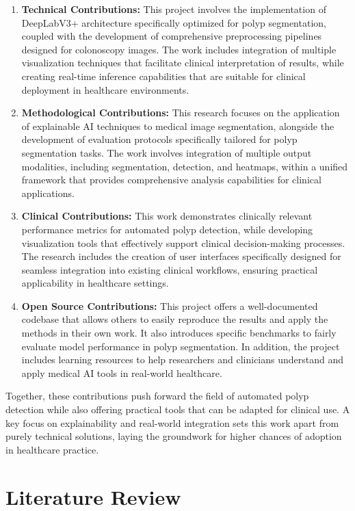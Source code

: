 \documentclass[a4paper,12pt]{report}
\begin{document}
\begin{enumerate}
    \item \textbf{Technical Contributions:} This project involves the implementation of DeepLabV3+ architecture specifically optimized for polyp segmentation, coupled with the development of comprehensive preprocessing pipelines designed for colonoscopy images. The work includes integration of multiple visualization techniques that facilitate clinical interpretation of results, while creating real-time inference capabilities that are suitable for clinical deployment in healthcare environments.

    \item \textbf{Methodological Contributions:} This research focuses on the application of explainable AI techniques to medical image segmentation, alongside the development of evaluation protocols specifically tailored for polyp segmentation tasks. The work involves integration of multiple output modalities, including segmentation, detection, and heatmaps, within a unified framework that provides comprehensive analysis capabilities for clinical applications.

    \item \textbf{Clinical Contributions:} This work demonstrates clinically relevant performance metrics for automated polyp detection, while developing visualization tools that effectively support clinical decision-making processes. The research includes the creation of user interfaces specifically designed for seamless integration into existing clinical workflows, ensuring practical applicability in healthcare settings.

    \item \textbf{Open Source Contributions:} This project offers a well-documented codebase that allows others to easily reproduce the results and apply the methods in their own work. It also introduces specific benchmarks to fairly evaluate model performance in polyp segmentation. In addition, the project includes learning resources to help researchers and clinicians understand and apply medical AI tools in real-world healthcare.
\end{enumerate}
Together, these contributions push forward the field of automated polyp detection while also offering practical tools that can be adapted for clinical use. A key focus on explainability and real-world integration sets this work apart from purely technical solutions, laying the groundwork for higher chances of adoption in healthcare practice.
\chapter{Literature Review}
\end{document}
